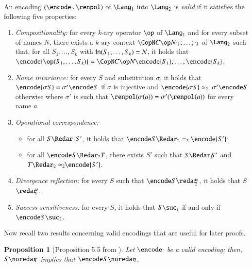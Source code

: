 \documentclass[submission,copyright,creativecommons]{eptcs}
\newtheorem{proposition}[theorem]{Proposition}
\newenvironment{definition}[1][Definition]{\begin{trivlist}
\item[\hskip \labelsep {\bfseries #1}]}{\end{trivlist}}
\renewcommand{\beq}{\simeq}
\begin{document}
\begin{definition}[Valid Encoding]
\label{def:ve}
An encoding $(\encode\cdot,\renpol)$ of $\Lang_1$ into $\Lang_2$
is {\em valid} if it satisfies the following five properties:
\begin{enumerate}
\item {\em Compositionality:} for every $k$-ary operator $\op$ of $\Lang_1$
and for every subset of names $N$,
there exists a $k$-ary context $\CopN C \op N {\cdot_1; \ldots; \cdot_k}$ of $\Lang_2$
such that, for all $S_1,\ldots,S_k$ with ${\sf fn}(S_1,\ldots,S_k) = N$, it holds
that $\encode{\op(S_1,\ldots,S_k)} = \CopN C \op N {\encode{S_1};\ldots;\encode{S_k}}$.

\item {\em Name invariance:}
for every $S$ and substitution $\sigma$, it holds that
$\encode{\sigma S} = \sigma'\encode S$ if $\sigma $ is injective and
$\encode{\sigma S} \beq_2\ \sigma'\encode S$ otherwise
where $\sigma'$ is such that 
$\renpol(\sigma(a)) = \sigma'(\renpol(a))$
for every name $a$.

\item {\em Operational correspondence:}
\begin{itemize}
\item for all $S \Redar_1 S'$, it holds that $\encode S \Redar_2 \beq_2 \encode {S'}$;
\item for all $\encode S \Redar_2 T$, there exists $S'$ such that $S \Redar_1\!\! S'$ 
and $T \Redar_2 \beq_2\!\! \encode {S'}$.
\end{itemize}

\item {\em Divergence reflection:}
for every $S$ such that 
$\encode S \redar\!\!_2^\omega$, it holds that  $S$ \mbox{$\redar\!\!_1^\omega$}.

\item {\em Success sensitiveness:}
for every $S$, it holds that $S \suc_1$ if and only if $\encode S \suc_2$.
\end{enumerate}
\end{definition}

Now recall two results concerning valid encodings that are useful for later proofs.

\begin{proposition}[Proposition 5.5 from \cite{G:CONCUR08}]
\label{prop:deadlock}
Let $\encode\cdot$ be a valid encoding; then, $S \noredar\!\!_1$
implies that $\encode S \noredar\!\!_2$.
\end{proposition}
\end{document}
